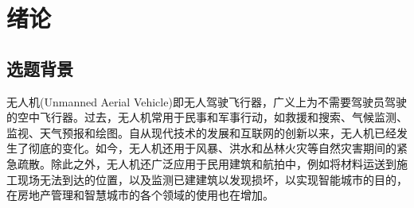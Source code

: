 \chapter{绪论}
\section{选题背景}
无人机(Unmanned Aerial Vehicle)即无人驾驶飞行器，广义上为不需要驾驶员驾驶的空中飞行器。过去，无人机常用于民事和军事行动，如救援和搜索、气候监测、监视、天气预报和绘图。自从现代技术的发展和互联网的创新以来，无人机已经发生了彻底的变化。如今，无人机还用于风暴、洪水和丛林火灾等自然灾害期间的紧急疏散。除此之外，无人机还广泛应用于民用建筑和航拍中，例如将材料运送到施工现场无法到达的位置，以及监测已建建筑以发现损坏，以实现智能城市的目的，在房地产管理和智慧城市的各个领域的使用也在增加。

